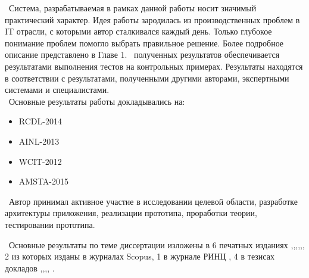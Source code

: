 \influence\ 
Система, разрабатываемая в рамках данной работы носит значимый практический характер. Идея работы зародилась из производственных проблем в IT отрасли, с которыми автор сталкивался каждый день. Только глубокое понимание проблем помогло выбрать правильное решение. Более подробное описание представлено в Главе 1.
\reliability\ полученных результатов обеспечивается результатами выполнения тестов на контрольных примерах. Результаты находятся в соответствии с результатами, полученными другими авторами, экспертными системами и специалистами. \\ 

\probation\
Основные результаты работы докладывались на:
\begin{itemize}
	\item RCDL-2014
	\item AINL-2013
	\item WCIT-2012
	\item AMSTA-2015
\end{itemize}

\contribution\ Автор принимал активное участие в исследовании целевой области, разработке архитектуры приложения, реализации прототипа, проработки теории, тестировании прототипа.

\publications\ Основные результаты по теме диссертации изложены в 6 печатных изданиях  \cite{Lobachevskii},\cite{WCIT-2012},\cite{RCDL-2014},\cite{AINL-2013},\cite{ISGZ},\cite{AMSTA-2015}, 
2 из которых изданы в журналах Scopus, 1 в журнале РИНЦ  \cite{ISGZ}, 
4 в тезисах докладов \cite{Lobachevskii},\cite{WCIT-2012},\cite{AINL-2013},\cite{ISGZ}, \cite{IJSE-1}.



